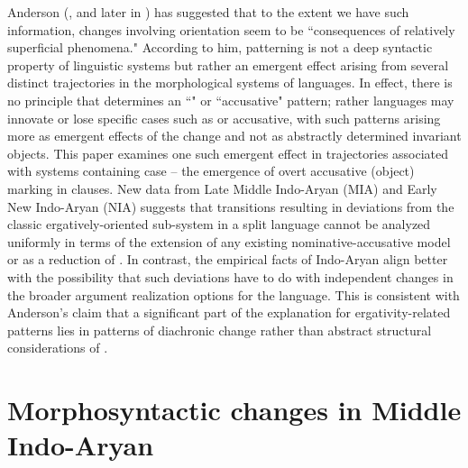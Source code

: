 \documentclass[output=paper,
modfonts
]{LSP/langsci}
\begin{document}
Anderson (\citeyear{anderson77}, and later in \citeyear{2004})%
has suggested  that to the extent we have such information,  changes involving  orientation seem to be ``consequences of relatively superficial phenomena."   According to him,  patterning is not a deep syntactic property of linguistic systems  but rather an emergent effect arising  from several distinct trajectories in the morphological systems  of languages. In effect, there is no principle that determines  an ``" or ``accusative" pattern; rather languages may innovate or lose specific cases such as  or accusative, with such patterns arising more as emergent effects of the change and not   as abstractly determined invariant objects. 
This paper examines one such emergent effect in trajectories associated with systems containing  case  -- the emergence of overt accusative (object) marking in  clauses. New  data from Late Middle Indo-Aryan (MIA)  and Early New Indo-Aryan (NIA) suggests that transitions resulting in deviations from the classic ergatively-oriented sub-system in a split  language cannot be analyzed uniformly in terms of  the  extension of  any existing  nominative-accusative model or as a reduction of .  In contrast,  the empirical facts of Indo-Aryan  align better with  the possibility that such deviations have to do with independent changes in the broader argument realization options for the language. 
This is consistent with  Anderson's claim that a significant part of the explanation for ergativity-related patterns lies in  patterns of diachronic change rather than abstract structural considerations  of  \citep[contra][]{delancey1981,dixon94,tsunoda1985}.

\section{Morphosyntactic changes in Middle  Indo-Aryan } 
\end{document}
